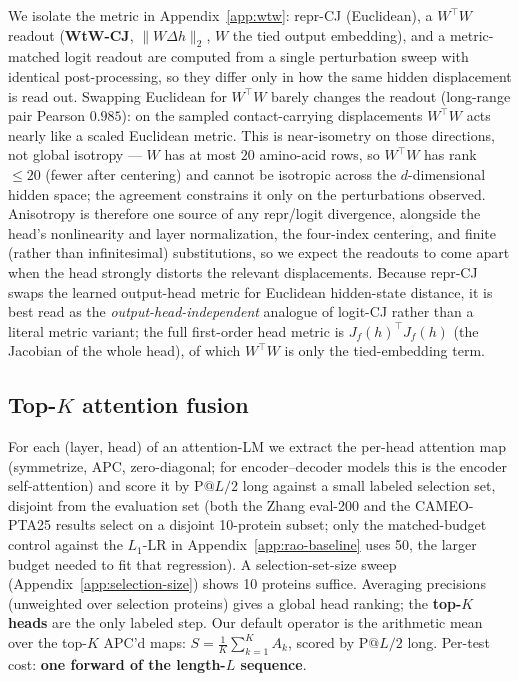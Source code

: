 \documentclass{article}
\begin{document}
We isolate the metric in Appendix~\ref{app:wtw}: repr-CJ (Euclidean), a
$W^\top W$ readout (\textbf{WtW-CJ}, $\|W\Delta h\|_2$, $W$ the tied
output embedding), and a metric-matched logit readout are computed from a
single perturbation sweep with identical post-processing, so they differ
only in how the same hidden displacement is read out. Swapping Euclidean for
$W^\top W$ barely changes the readout (long-range pair Pearson $0.985$):
on the sampled contact-carrying displacements $W^\top W$ acts nearly like
a scaled Euclidean metric. This is near-isometry on those directions, not
global isotropy --- $W$ has at most $20$ amino-acid rows, so $W^\top W$
has rank $\leq 20$ (fewer after centering) and cannot be isotropic across
the $d$-dimensional hidden space; the agreement constrains it only on the
perturbations observed. Anisotropy is therefore one source of any
repr/logit divergence, alongside the head's nonlinearity and layer
normalization, the four-index centering, and finite (rather than
infinitesimal) substitutions, so we expect the readouts to come apart
when the head strongly distorts the relevant displacements. Because
repr-CJ swaps the learned output-head metric for Euclidean hidden-state
distance, it is best read as the \emph{output-head-independent} analogue
of logit-CJ rather than a literal metric variant; the full first-order
head metric is $J_f(h)^\top J_f(h)$ (the Jacobian of the whole head), of
which $W^\top W$ is only the tied-embedding term.

\subsection{Top-$K$ attention fusion}
\label{sec:fusion}

For each (layer, head) of an attention-LM we extract the
per-head attention map (symmetrize, APC, zero-diagonal; for encoder--decoder
models this is the encoder self-attention) and score it
by $\text{P}@L/2$ long against a small labeled selection set, disjoint
from the evaluation set (both the Zhang eval-200 and the CAMEO-PTA25
results select on a disjoint 10-protein subset; only the matched-budget
control against the $L_1$-LR in Appendix~\ref{app:rao-baseline} uses 50,
the larger budget needed to fit that regression). A selection-set-size sweep
(Appendix~\ref{app:selection-size}) shows 10 proteins suffice.
Averaging precisions (unweighted over selection proteins) gives a global head ranking; the \textbf{top-$K$
heads} are the only labeled step. Our default operator is the
arithmetic mean over the top-$K$ APC'd maps:
$S = \tfrac{1}{K} \sum_{k=1}^{K} A_{k}$, scored by
$\text{P}@L/2$ long. Per-test cost: \textbf{one forward of the
length-$L$ sequence}.
\end{document}
